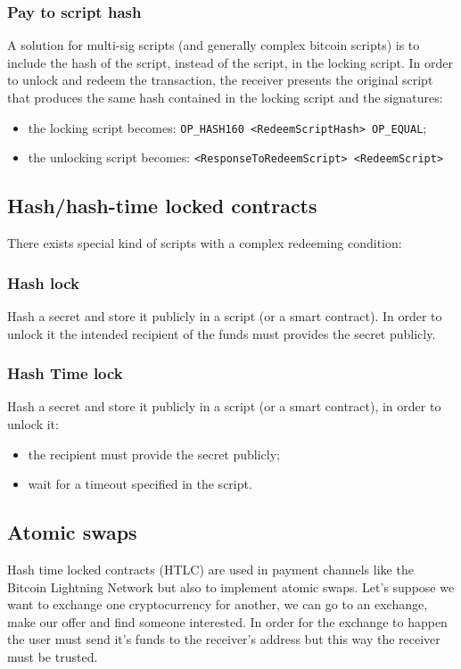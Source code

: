 \subsubsection{Pay to script hash}
A solution for multi-sig scripts (and generally complex bitcoin scripts) is to include the hash of the script, instead of the script, in the locking script.
In order to unlock and redeem the transaction, the receiver presents the original script that produces the same hash contained in the locking script and the signatures:
\begin{itemize}
    \item the locking script becomes: \verb|OP_HASH160 <RedeemScriptHash> OP_EQUAL|;
    \item the unlocking script becomes: \verb|<ResponseToRedeemScript> <RedeemScript>|
\end{itemize}

\subsection{Hash/hash-time locked contracts}
There exists special kind of scripts with a complex redeeming condition:

\subsubsection{Hash lock}
Hash a secret and store it publicly in a script (or a smart contract).
In order to unlock it the intended recipient of the funds must provides the secret publicly.

\subsubsection{Hash Time lock}
Hash a secret and store it publicly in a script (or a smart contract), in order to unlock it:
\begin{itemize}
    \item the recipient must provide the secret publicly;
    \item wait for a timeout specified in the script.
\end{itemize}

\subsection{Atomic swaps}
Hash time locked contracts (HTLC) are used in payment channels like the Bitcoin Lightning Network but also to implement atomic swaps.
Let's suppose we want to exchange one cryptocurrency for another, we can go to an exchange, make our offer and find someone interested.
In order for the exchange to happen the user must send it's funds to the receiver's address but this way the receiver must be trusted.

